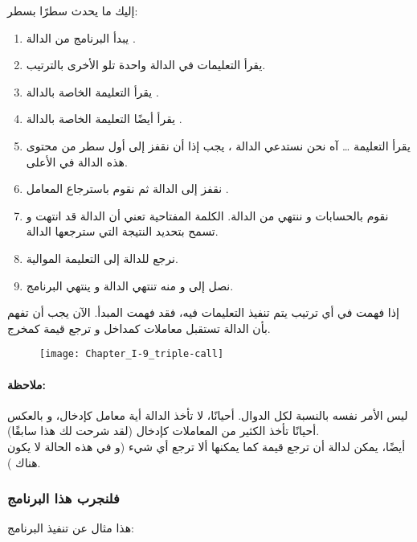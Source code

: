 إليك ما يحدث سطرًا بسطر:

\begin{enumerate}
	\item يبدأ البرنامج من الدالة
	.
	\item يقرأ التعليمات في الدالة واحدة تلو الأخرى بالترتيب.
	\item يقرأ التعليمة الخاصة بالدالة
	.
	\item يقرأ أيضًا التعليمة الخاصة بالدالة 
	.
	\item يقرأ التعليمة
	\dots
	آه نحن نستدعي الدالة 
	،
	يجب إذا أن نقفز إلى أول سطر من محتوى هذه الدالة في الأعلى.
	\item نقفز إلى الدالة
	 ثم نقوم باسترجاع المعامل
	.
	\item نقوم بالحسابات و ننتهي من الدالة. الكلمة المفتاحية 
	تعني أن الدالة قد انتهت و تسمح بتحديد النتيجة التي سترجعها الدالة.
	\item نرجع للدالة 
	إلى التعليمة الموالية.
	\item نصل إلى 
	و منه تنتهي الدالة
	و ينتهي البرنامج.
\end{enumerate}

إذا فهمت في أي ترتيب يتم تنفيذ التعليمات فيه، فقد فهمت المبدأ. الآن يجب أن تفهم بأن الدالة تستقبل معاملات كمداخل و ترجع قيمة كمخرج.

\begin{figure}[H]
	\centering
	\texttt{[image: Chapter\_I-9\_triple-call]}
\end{figure}

\paragraph{ملاحظة:}

ليس الأمر نفسه بالنسبة لكل الدوال. أحيانًا، لا تأخذ الدالة أية معامل كإدخال، و بالعكس أحيانًا تأخذ الكثير من المعاملات كإدخال (لقد شرحت لك هذا سابقًا).\\
أيضًا، يمكن لدالة أن ترجع قيمة كما يمكنها ألا ترجع أي شيء (و في هذه الحالة لا يكون هناك
).

\subsubsection{فلنجرب هذا البرنامج}

هذا مثال عن تنفيذ البرنامج:

